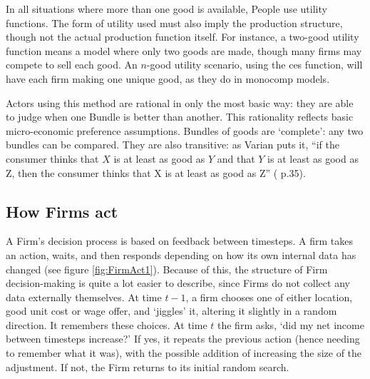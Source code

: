 In all situations where more than one good is available, People use utility functions. The form of utility used must also imply the production structure, though not the actual production function itself. For instance, a two-good utility function means a model where only two goods are made, though many firms may compete to sell each good. An $n$-good utility scenario, using the \gls{ces} function, will have each firm making one unique good, as they do in \gls{monocomp} models.

Actors using this method are rational in only the most basic way: they are able to judge when one Bundle is better than another. This rationality reflects basic micro-economic preference assumptions. Bundles of goods are `complete': any two bundles can be compared. They are also transitive: as Varian puts it, ``if the consumer thinks that $X$ is at least as good as $Y$ and that $Y$ is at least as good as Z, then the consumer thinks that X is at least as good as Z'' (\citealt{varian_intermediate_2006} p.35). 



\subsection{How Firms act \label{sec:howFirmsAct}}

A Firm's decision process is based on feedback between timesteps. A firm takes an action, waits, and then responds depending on how its own internal data has changed (see figure \ref{fig:FirmAct1}). Because of this, the structure of Firm decision-making is quite a lot easier to describe, since Firms do not collect any data externally themselves. 
At time $t-1$, a firm chooses one of either location, good unit cost or wage offer, and `jiggles' it, altering it slightly in a random direction. It remembers these choices. At time $t$ the firm asks, `did my net income between timesteps increase?' If yes, it repeats the previous action (hence needing to remember what it was), with the possible addition of increasing the size of the adjustment. If not, the Firm returns to its initial random search.

